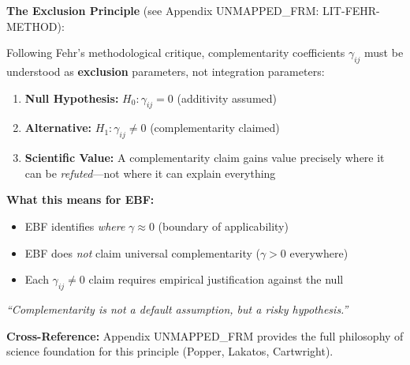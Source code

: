 \begin{tcolorbox}[colback=red!5!white, colframe=red!75!black,
    title=\textbf{Methodological Principle: $\gamma = 0$ as Null Hypothesis}]

\textbf{The Exclusion Principle} (see Appendix UNMAPPED_FRM: LIT-FEHR-METHOD):

Following Fehr's methodological critique, complementarity coefficients $\gamma_{ij}$
must be understood as \textbf{exclusion} parameters, not integration parameters:

\begin{enumerate}[noitemsep]
    \item \textbf{Null Hypothesis:} $H_0: \gamma_{ij} = 0$ (additivity assumed)
    \item \textbf{Alternative:} $H_1: \gamma_{ij} \neq 0$ (complementarity claimed)
    \item \textbf{Scientific Value:} A complementarity claim gains value precisely
          where it can be \textit{refuted}---not where it can explain everything
\end{enumerate}

\textbf{What this means for EBF:}
\begin{itemize}[noitemsep]
    \item EBF identifies \textit{where} $\gamma \approx 0$ (boundary of applicability)
    \item EBF does \textit{not} claim universal complementarity ($\gamma > 0$ everywhere)
    \item Each $\gamma_{ij} \neq 0$ claim requires empirical justification against the null
\end{itemize}

\textit{``Complementarity is not a default assumption, but a risky hypothesis.''}

\textbf{Cross-Reference:} Appendix UNMAPPED_FRM provides the full philosophy of science
foundation for this principle (Popper, Lakatos, Cartwright).

\end{tcolorbox}


